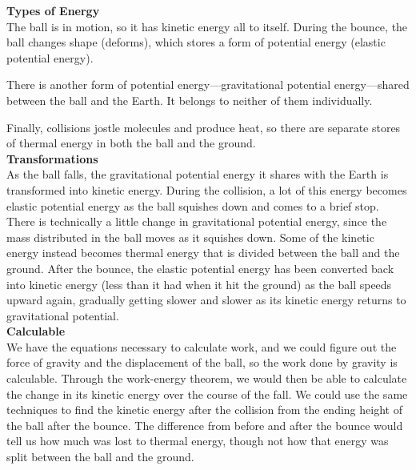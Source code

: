 \documentclass[]{article}
\begin{document}
\begin{TeacherMargin}
\noindent\textbf{Types of Energy} \\
The ball is in motion, so it has kinetic energy all to itself. During the bounce, the ball changes shape (deforms), which stores a form of potential energy (elastic potential energy).

There is another form of potential energy---gravitational potential energy---shared between the ball and the Earth. It belongs to neither of them individually.

Finally, collisions jostle molecules and produce heat, so there are separate stores of thermal energy in both the ball and the ground. \\
\textbf{Transformations} \\
As the ball falls, the gravitational potential energy it shares with the Earth is transformed into kinetic energy. During the collision, a lot of this energy becomes elastic potential energy as the ball squishes down and comes to a brief stop. There is technically a little change in gravitational potential energy, since the mass distributed in the ball moves as it squishes down. Some of the kinetic energy instead becomes thermal energy that is divided between the ball and the ground. After the bounce, the elastic potential energy has been converted back into kinetic energy (less than it had when it hit the ground) as the ball speeds upward again, gradually getting slower and slower as its kinetic energy returns to gravitational potential. \\
\textbf{Calculable} \\
We have the equations necessary to calculate work, and we could figure out the force of gravity and the displacement of the ball, so the work done by gravity is calculable. Through the work-energy theorem, we would then be able to calculate the change in its kinetic energy over the course of the fall. We could use the same techniques to find the kinetic energy after the collision from the ending height of the ball after the bounce. The difference from before and after the bounce would tell us how much was lost to thermal energy, though not how that energy was split between the ball and the ground.
\end{TeacherMargin}
\end{document}
